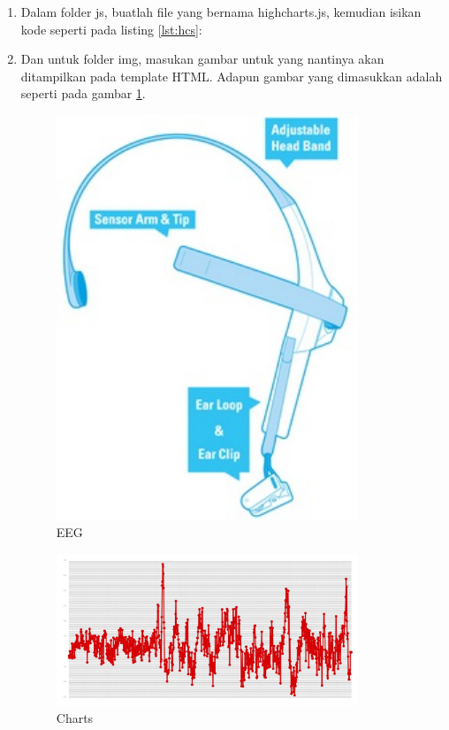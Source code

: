 \begin{enumerate}
\item Dalam folder js, buatlah file yang bernama highcharts.js, kemudian isikan kode seperti pada listing \ref{lst:hcs}:


\item Dan untuk folder img, masukan gambar untuk yang nantinya akan ditampilkan pada template HTML. Adapun gambar yang dimasukkan adalah seperti pada gambar \ref{fig:eeg}.
\begin{figure}[!htbp]
	\centerline{\includegraphics[width=0.85\textwidth]{figures/12/eeg.PNG}}
	\caption{EEG}
	\label{fig:eeg}
\end{figure}

\begin{figure}[!htbp]
	\centerline{\includegraphics[width=0.85\textwidth]{figures/12/charts.PNG}}
	\caption{Charts}
	\label{fig:charts}
\end{figure}


\end{enumerate}
